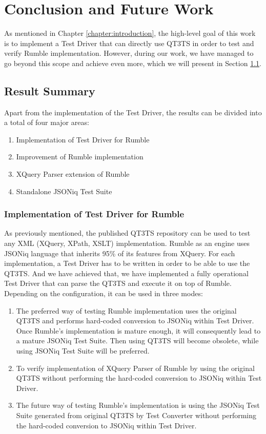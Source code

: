 \chapter{Conclusion and Future Work} 
\label{chapter:conclusions}
As mentioned in Chapter \ref{chapter:introduction}, the high-level goal of this work is to implement a Test Driver that can directly use QT3TS in order to test and verify Rumble implementation. However, during our work, we have managed to go beyond this scope and achieve even more, which we will present in Section \ref{sec:overallsummary}.

\section{Result Summary}
\label{sec:overallsummary}
Apart from the implementation of the Test Driver, the results can be divided into a total of four major areas:
\begin{enumerate}
	\item Implementation of Test Driver for Rumble
	\item Improvement of Rumble implementation
	\item XQuery Parser extension of Rumble
	\item Standalone JSONiq Test Suite
\end{enumerate}

\subsection{Implementation of Test Driver for Rumble}
As previously mentioned, the published QT3TS repository \cite{TestSuiteGitHubRepository} can be used to test any XML (XQuery, XPath, XSLT) implementation. Rumble as an engine uses JSONiq language that inherits 95\% of its features from XQuery. For each implementation, a Test Driver has to be written in order to be able to use the QT3TS. And we have achieved that, we have implemented a fully operational Test Driver that can parse the QT3TS and execute it on top of Rumble. Depending on the configuration, it can be used in three modes:
\begin{enumerate}
	\item The preferred way of testing Rumble implementation uses the original QT3TS and performs hard-coded conversion to JSONiq within Test Driver. Once Rumble's implementation is mature enough, it will consequently lead to a mature JSONiq Test Suite. Then using QT3TS will become obsolete, while using JSONiq Test Suite will be preferred.
	\item  To verify implementation of XQuery Parser of Rumble by using the original QT3TS without performing the hard-coded conversion to JSONiq within Test Driver.
	\item The future way of testing Rumble's implementation is using the JSONiq Test Suite generated from original QT3TS by Test Converter without performing the hard-coded conversion to JSONiq within Test Driver.
\end{enumerate} 

